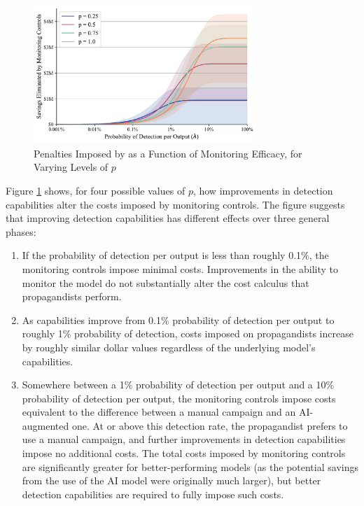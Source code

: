 \documentclass{article}
\begin{document}
\begin{figure}[h]
  \centering
  \includegraphics[width=0.75\textwidth]{figures/detection_penalties.pdf}
  \caption{Penalties Imposed by as a Function of Monitoring Efficacy, for Varying Levels of $p$}
  \label{fig:penalties}
\end{figure}

Figure \ref{fig:penalties} shows, for four possible values of $p$, how improvements in detection capabilities alter the costs imposed by monitoring controls. The figure suggests that improving detection capabilities has different effects over three general phases:

\begin{enumerate}
  \item If the probability of detection per output is less than roughly 0.1\%, the monitoring controls impose minimal costs. Improvements in the ability to monitor the model do not substantially alter the cost calculus that propagandists perform.
  \item As capabilities improve from 0.1\% probability of detection per output to roughly 1\% probability of detection, costs imposed on propagandists increase by roughly similar dollar values regardless of the underlying model's capabilities. 
  \item Somewhere between a 1\% probability of detection per output and a 10\% probability of detection per output, the monitoring controls impose costs equivalent to the difference between a manual campaign and an AI-augmented one. At or above this detection rate, the propagandist prefers to use a manual campaign, and further improvements in detection capabilities impose no additional costs. The total costs imposed by monitoring controls are significantly greater for better-performing models (as the potential savings from the use of the AI model were originally much larger), but better detection capabilities are required to fully impose such costs.  
\end{enumerate}
\end{document}
